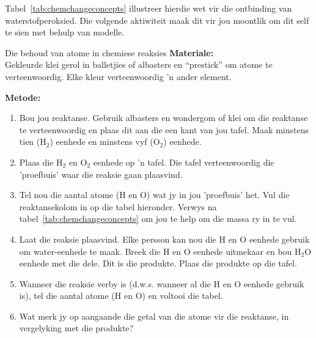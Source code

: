 
Tabel~\ref{tab:chemchangeconcepts} illustreer hierdie wet vir die ontbinding van waterstofperoksied. Die volgende aktiwiteit maak dit vir jou moontlik om dit self te sien met behulp van modelle.
            \begin{activity}{Die behoud van atome in chemiese reaksies}
            \nopagebreak
            \label{m38711*id64844}\noindent
\textbf{Materiale:} \\ Gekleurde klei gerol in balletjies of albasters en “prestick” om atome te verteenwoordig. Elke kleur verteenwoordig 'n ander element.
        \par 
      \label{m38711*id64882}\noindent
\textbf{Metode:}\\
      \label{m38711*id64889}\begin{enumerate}[noitemsep, label=\textbf{\arabic*}. ] 
\label{m38711*uid36}\item Bou jou reaktanse. Gebruik albasters en wondergom of klei om die reaktanse te verteenwoordig en plaas dit aan die een kant van jou tafel. Maak minstens tien ($\text{H}_{2}$) eenhede en minstens vyf ($\text{O}_{2}$) eenhede.
\label{m38711*uid37}\item Plaas die $\text{H}_{2}$ en $\text{O}_{2}$ eenhede op 'n tafel. Die tafel verteenwoordig die 'proefbuis' waar die reaksie gaan plaasvind.
\label{m38711*uid38}\item Tel nou die aantal atome ($\text{H}$ en $\text{O}$) wat jy in jou 'proefbuis' het. Vul die reaktansekolom in op die tabel hieronder. Verwys na tabel~\ref{tab:chemchangeconcepts} om jou te help om die massa ry in te vul.
\label{m38711*uid39}\item Laat die reaksie plaasvind. Elke persson kan nou die $\text{H}$ en $\text{O}$ eenhede gebruik om water-eenhede te maak. Breek die $\text{H}$ en $\text{O}$ eenhede uitmekaar en bou $\text{H}_{2}\text{O}$ eenhede met die dele. Dit is die produkte. Plaas die produkte op die tafel. 
\item Wanneer die reaksie verby is (d.w.s. wanneer al die $\text{H}$ en $\text{O}$ eenhede gebruik is), tel die aantal atome ($\text{H}$ en $\text{O}$) en voltooi die tabel.
\item Wat merk jy op aangaande die getal van die atome vir die reaktanse, in vergelyking met die produkte?

\end{enumerate}
\end{activity}
